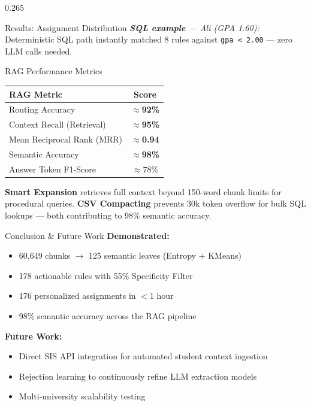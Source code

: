 \documentclass[final]{beamer}
\newcommand{\compactitem}{%
  \setlength{\itemsep}{4pt}%
  \setlength{\parskip}{0pt}%
  \setlength{\parsep}{0pt}%
  \setlength{\topsep}{2pt}%
}
\begin{document}
\begin{frame}[t]
\begin{columns}[T]
\begin{column}{0.265\paperwidth}
\begin{block}{Results: Assignment Distribution}
\vskip0.20cm
\textit{\small \textbf{SQL example} --- Ali (GPA 1.60):}
Deterministic SQL path instantly matched 8 rules against
\texttt{gpa < 2.00} --- zero LLM calls needed.
\end{block}

\begin{block}{RAG Performance Metrics}
\begin{center}
\begin{tabular}{lc}
  \toprule
  \textbf{RAG Metric}             & \textbf{Score} \\
  \midrule
  Routing Accuracy                & $\approx$\textbf{92\%} \\
  Context Recall (Retrieval)      & $\approx$\textbf{95\%} \\
  Mean Reciprocal Rank (MRR)      & $\approx$\textbf{0.94} \\
  Semantic Accuracy               & $\approx$\textbf{98\%} \\
  Answer Token F1-Score           & $\approx$78\% \\
  \bottomrule
\end{tabular}
\end{center}

\vskip0.20cm
{\small\textbf{Smart Expansion} retrieves full context
beyond 150-word chunk limits for procedural queries.
\textbf{CSV Compacting} prevents 30k token overflow for
bulk SQL lookups --- both contributing to 98\% semantic
accuracy.}
\end{block}

\begin{block}{Conclusion \& Future Work}
\textbf{Demonstrated:}
\begin{itemize}\compactitem
  \item[$\checkmark$] 60,649 chunks $\to$ 125 semantic
        leaves (Entropy + KMeans)
  \item[$\checkmark$] 178 actionable rules with 55\%
        Specificity Filter
  \item[$\checkmark$] 176 personalized assignments in
        $<$1 hour
  \item[$\checkmark$] 98\% semantic accuracy across the
        RAG pipeline
\end{itemize}

\vskip0.35cm
\textbf{Future Work:}
\begin{itemize}\compactitem
  \item Direct SIS API integration for automated student
        context ingestion
  \item Rejection learning to continuously refine LLM
        extraction models
  \item Multi-university scalability testing
\end{itemize}
\end{block}

\end{column}

\end{columns}
\end{frame}
\end{document}
